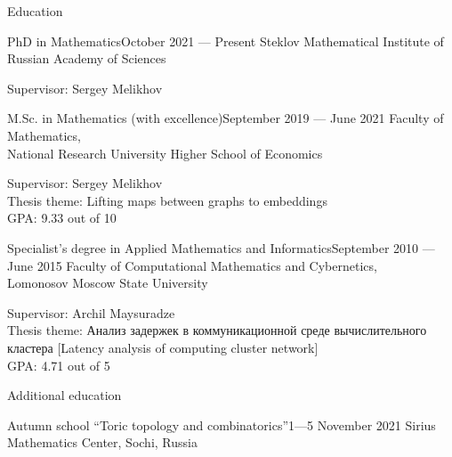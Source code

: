 \documentclass{resume}
\begin{document}
\begin{rSection}{Education}
\begin{rSubsection}{PhD in Mathematics}{October 2021 --- Present}{}
  Steklov Mathematical Institute of Russian Academy of Sciences\vspace{0.5em}

  Supervisor: Sergey Melikhov
\end{rSubsection}

\begin{rSubsection}{M.Sc. in Mathematics (with excellence)}{September 2019 --- June 2021}{}
  Faculty of Mathematics, \\
  National Research University Higher School of Economics \vspace{0.5em}

  Supervisor: Sergey Melikhov \\
  Thesis theme: Lifting maps between graphs to embeddings \\
  GPA: 9.33 out of 10
\end{rSubsection}

\begin{rSubsection}{Specialist's degree in Applied Mathematics and Informatics}{September 2010 --- June 2015}{}
  Faculty of Computational Mathematics and Cybernetics, \\
  Lomonosov Moscow State University \vspace{0.5em}

  Supervisor: Archil Maysuradze \\
  Thesis theme: Анализ задержек в коммуникационной среде вычислительного кластера [Latency analysis of computing cluster network] \\
  GPA: 4.71 out of 5
\end{rSubsection}
\end{rSection}

\begin{rSection}{Additional education}
  \begin{rSubsection}{Autumn school ``Toric topology and combinatorics''}{1---5 November 2021}{} 
    Sirius Mathematics Center, Sochi, Russia
  \end{rSubsection}
\end{rSection}
\end{document}
